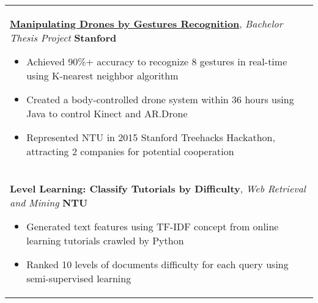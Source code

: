 \documentclass[a4paper,11pt]{article} %
\begin{document}
{\begin{tabular}{p{18.5cm}}
\href{https://www.youtube.com/watch?v=jxsZaQ6PcXU}{\bf{Manipulating Drones by Gestures Recognition}}, {\it{Bachelor Thesis Project}} \hfill {\bf{Stanford}}
\begin{itemize}%
\item Achieved 90\%+ accuracy to recognize 8 gestures in real-time using K-nearest neighbor algorithm %
\item Created a body-controlled drone system within 36 hours using Java to control Kinect and AR.Drone
\item Represented NTU in 2015 Stanford Treehacks Hackathon, attracting 2 companies for potential cooperation \vspace*{-\baselineskip}
\end{itemize}\\
\vspace{.1mm}

{\bf{Level Learning: Classify Tutorials by Difficulty}}, {\it{Web Retrieval and Mining}} \hfill {\bf{NTU}}
\begin{itemize}
\item Generated text features using TF-IDF concept from online learning tutorials crawled by Python %
\item Ranked 10 levels of documents difficulty for each query using semi-supervised learning\vspace*{-\baselineskip}
\end{itemize}\\
%
\end{tabular}

}
\end{document}
